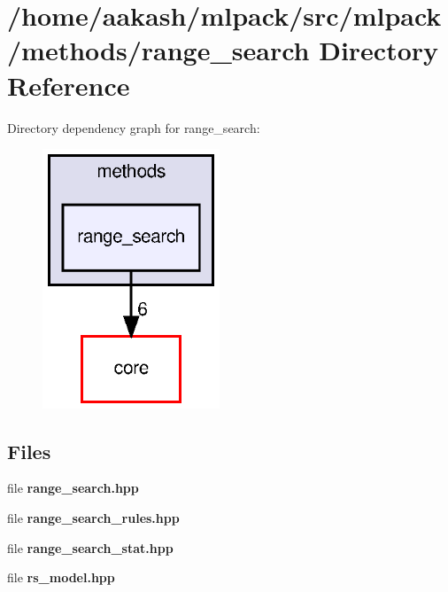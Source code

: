 \section{/home/aakash/mlpack/src/mlpack/methods/range\+\_\+search Directory Reference}
\label{dir_b810cce4cae1d8b45f5dab38895e0781}
Directory dependency graph for range\+\_\+search\+:
\nopagebreak
\begin{figure}[H]
\begin{center}
\leavevmode
\includegraphics[width=150pt]{dir_b810cce4cae1d8b45f5dab38895e0781_dep}
\end{center}
\end{figure}
\subsection*{Files}
\begin{DoxyCompactItemize}
\item 
file \textbf{ range\+\_\+search.\+hpp}
\item 
file \textbf{ range\+\_\+search\+\_\+rules.\+hpp}
\item 
file \textbf{ range\+\_\+search\+\_\+stat.\+hpp}
\item 
file \textbf{ rs\+\_\+model.\+hpp}
\end{DoxyCompactItemize}
